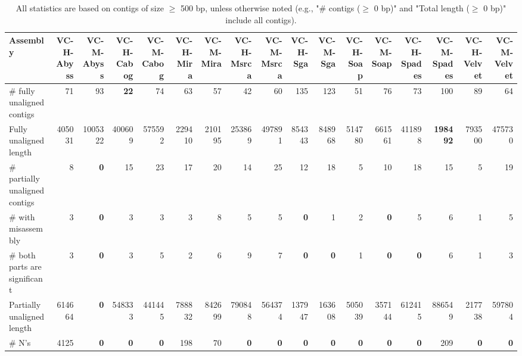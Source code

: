\documentclass[12pt,a4paper]{article}
\begin{document}
\begin{table}[ht]
\begin{center}
\caption{All statistics are based on contigs of size $\geq$ 500 bp, unless otherwise noted (e.g., "\# contigs ($\geq$ 0 bp)" and "Total length ($\geq$ 0 bp)" include all contigs).}
\begin{tabular}{|l*{16}{|r}|}
\hline
Assembly & VC-H-Abyss & VC-M-Abyss & VC-H-Cabog & VC-M-Cabog & VC-H-Mira & VC-M-Mira & VC-H-Msrca & VC-M-Msrca & VC-H-Sga & VC-M-Sga & VC-H-Soap & VC-M-Soap & VC-H-Spades & VC-M-Spades & VC-H-Velvet & VC-M-Velvet \\ \hline
\# fully unaligned contigs & 71 & 93 & {\bf 22} & 74 & 63 & 57 & 42 & 60 & 135 & 123 & 51 & 76 & 73 & 100 & 89 & 64 \\ \hline
Fully unaligned length & 405031 & 1005322 & 400609 & 575592 & 229410 & 210195 & 253869 & 497891 & 854343 & 848968 & 514780 & 661561 & 411898 & {\bf 198492} & 793500 & 475730 \\ \hline
\# partially unaligned contigs & 8 & {\bf 0} & 15 & 23 & 17 & 20 & 14 & 25 & 12 & 18 & 5 & 10 & 18 & 15 & 5 & 19 \\ \hline
\hspace{5mm}\# with misassembly & 3 & {\bf 0} & 3 & 3 & 3 & 8 & 5 & 5 & {\bf 0} & 1 & 2 & {\bf 0} & 5 & 6 & 1 & 5 \\ \hline
\hspace{5mm}\# both parts are significant & 3 & {\bf 0} & 3 & 5 & 2 & 6 & 9 & 7 & {\bf 0} & {\bf 0} & 1 & {\bf 0} & {\bf 0} & 6 & 1 & 3 \\ \hline
Partially unaligned length & 614664 & {\bf 0} & 548333 & 441445 & 788832 & 842699 & 790848 & 564374 & 137947 & 163608 & 505039 & 357144 & 612415 & 886549 & 217738 & 597804 \\ \hline
\# N's & 4125 & {\bf 0} & {\bf 0} & {\bf 0} & 198 & 70 & {\bf 0} & {\bf 0} & {\bf 0} & {\bf 0} & {\bf 0} & {\bf 0} & {\bf 0} & 209 & {\bf 0} & {\bf 0} \\ \hline
\end{tabular}
\end{center}
\end{table}
\end{document}
